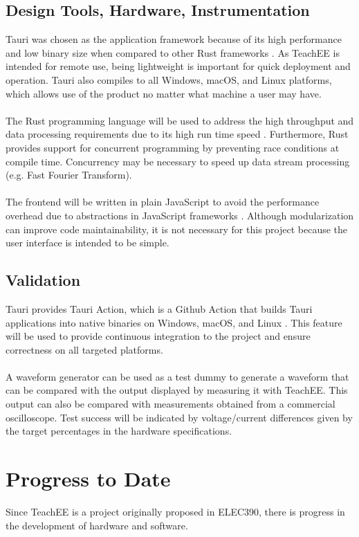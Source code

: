 \documentclass[letterpaper,12pt]{article}
\begin{document}
\subsection{Design Tools, Hardware, Instrumentation}
Tauri was chosen as the application framework because of its high performance
and low binary size when compared to other Rust frameworks 
\cite{tauri_benchmarks}. As TeachEE is intended for remote use, being
lightweight is important for quick deployment and operation. Tauri also compiles
to all Windows, macOS, and Linux platforms, which allows use of the product no
matter what machine a user may have.
\\~\\
The Rust programming language will be used to address the high throughput and
data processing requirements due to its high run time speed \cite{rust_speed}.
Furthermore, Rust provides support for concurrent programming by preventing race
conditions at compile time. Concurrency may be necessary to speed up data stream
processing (e.g. Fast Fourier Transform).
\\~\\
The frontend will be written in plain JavaScript to avoid the performance
overhead due to abstractions in JavaScript frameworks \cite{javascript_speed}.
Although modularization can improve code maintainability, it is not necessary
for this project because the user interface is intended to be simple.

\subsection{Validation}
Tauri provides Tauri Action, which is a Github Action that builds Tauri
applications into native binaries on Windows, macOS, and Linux
\cite{tauri_actions}. This feature will be used to provide continuous integration
to the project and ensure correctness on all targeted platforms.
\\~\\
A waveform generator can be used as a test dummy to generate a waveform that
can be compared with the output displayed by measuring it with TeachEE.
This output can also be compared with measurements obtained from a commercial
oscilloscope. Test success will be indicated by voltage/current differences
given by the target percentages in the hardware specifications.

\section{Progress to Date} %
Since TeachEE is a project originally proposed in ELEC390, there is progress in
the development of hardware and software.
\end{document}
